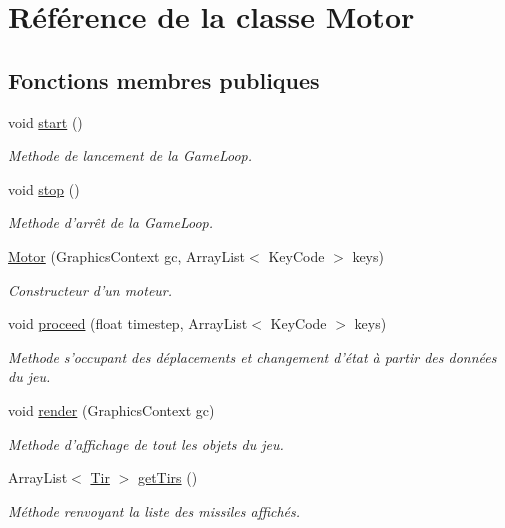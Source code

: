 \hypertarget{class_motor}{\section{Référence de la classe Motor}
\label{class_motor}
}
\subsection*{Fonctions membres publiques}
\begin{DoxyCompactItemize}
\item 
void \hyperlink{class_motor_a6ae139ee985ef74ec9704b895f3b8895}{start} ()
\begin{DoxyCompactList}\small\item\em Methode de lancement de la Game\-Loop. \end{DoxyCompactList}\item 
void \hyperlink{class_motor_a9a5d81ced7a0f9d679732839a8f77d3a}{stop} ()
\begin{DoxyCompactList}\small\item\em Methode d'arrêt de la Game\-Loop. \end{DoxyCompactList}\item 
\hyperlink{class_motor_ac2cb95916f7081fef0b4582db086404e}{Motor} (Graphics\-Context gc, Array\-List$<$ Key\-Code $>$ keys)
\begin{DoxyCompactList}\small\item\em Constructeur d'un moteur. \end{DoxyCompactList}\item 
void \hyperlink{class_motor_a5333ff4fde112f55953849964f8ae7fa}{proceed} (float timestep, Array\-List$<$ Key\-Code $>$ keys)
\begin{DoxyCompactList}\small\item\em Methode s'occupant des déplacements et changement d'état à partir des données du jeu. \end{DoxyCompactList}\item 
void \hyperlink{class_motor_a73f2becef3f9ceb3a54b9698e8ef7d05}{render} (Graphics\-Context gc)
\begin{DoxyCompactList}\small\item\em Methode d'affichage de tout les objets du jeu. \end{DoxyCompactList}\item 
Array\-List$<$ \hyperlink{class_tir}{Tir} $>$ \hyperlink{class_motor_ab31da9ce3d509a33029d6025f3596604}{get\-Tirs} ()
\begin{DoxyCompactList}\small\item\em Méthode renvoyant la liste des missiles affichés. \end{DoxyCompactList}\item 

\end{DoxyCompactItemize}

